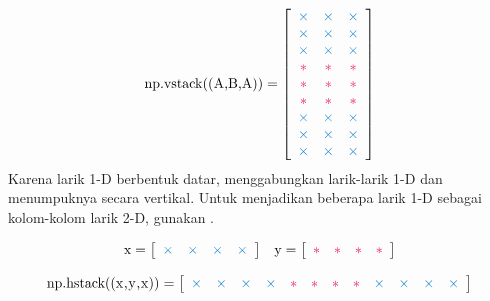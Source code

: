 \begin{align*}
\text{\li{np.vstack((A,B,A))}} =
\left[\begin{array}{ccc}
\textcolor{blue}{\times}&\textcolor{blue}{\times}&\textcolor{blue}{\times}\\
\textcolor{blue}{\times}&\textcolor{blue}{\times}&\textcolor{blue}{\times}\\
\textcolor{blue}{\times}&\textcolor{blue}{\times}&\textcolor{blue}{\times}\\
\textcolor{red}{*} & \textcolor{red}{*} & \textcolor{red}{*} \\
\textcolor{red}{*} & \textcolor{red}{*} & \textcolor{red}{*} \\
\textcolor{red}{*} & \textcolor{red}{*} & \textcolor{red}{*} \\
\textcolor{blue}{\times}&\textcolor{blue}{\times}&\textcolor{blue}{\times}\\
\textcolor{blue}{\times}&\textcolor{blue}{\times}&\textcolor{blue}{\times}\\
\textcolor{blue}{\times}&\textcolor{blue}{\times}&\textcolor{blue}{\times}
\end{array}\right]
\end{align*}
Karena larik 1-D berbentuk datar,  menggabungkan larik-larik 1-D dan  menumpuknya secara vertikal.
Untuk menjadikan beberapa larik 1-D sebagai kolom-kolom larik 2-D, gunakan .

\begin{align*}
\text{\li{x}} = \left[\begin{array}{cccc}
\textcolor{blue}{\times}&\textcolor{blue}{\times}&\textcolor{blue}{\times}&\textcolor{blue}{\times}
\end{array}\right]
&&
\text{\li{y}} = \left[\begin{array}{cccc}
\textcolor{red}{*}&\textcolor{red}{*}&\textcolor{red}{*}&\textcolor{red}{*}\end{array}\right]
\end{align*}

\begin{align*}
\text{\li{np.hstack((x,y,x))}} =
\left[\begin{array}{cccccccccccc}
\textcolor{blue}{\times}&\textcolor{blue}{\times}&\textcolor{blue}{\times}&\textcolor{blue}{\times}&
\textcolor{red}{*}&\textcolor{red}{*}&\textcolor{red}{*}&\textcolor{red}{*}&
\textcolor{blue}{\times}&\textcolor{blue}{\times}&\textcolor{blue}{\times}&\textcolor{blue}{\times}
\end{array}\right]
\end{align*}

